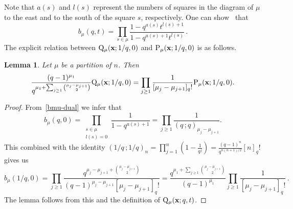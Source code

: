 \documentclass[12pt,a4paper,reqno]{amsart}
\theoremstyle{plain}
\newtheorem{lemma}[theorem]{Lemma}
\theoremstyle{definition}
\newcommand{\1}{\mathds{1}}
\renewcommand{\P}{\mathrm{P}}
\newcommand{\Q}{\mathrm{Q}}
\newcommand{\x}{{\bf x}}
\begin{document}
Note that $a(s)$ and $l(s)$ represent the numbers of squares in the diagram of $\mu$ to the east and to the south of the square $s$, respectively. One can show~\cite[p. 339, Eq. (6.19)]{Macdonald} that
\begin{equation}\label{bmu-dual}
b_\mu(q, t) = \prod_{s\in \mu}\frac{1-q^{a(s)}t^{l(s)+1}}{1-q^{a(s)+1}t^{l(s)}}\, .
\end{equation}
The explicit relation between $\Q_\mu(\x;1/q,0)$ and $\P_\mu(\x;1/q,0)$ is as follows.   
\begin{lemma}\label{b_mu(1/q)} Let $\mu$ be a partition of $n$. 
Then 
\begin{equation}
    \frac{(q-1)^{\mu_1}}{q^{\mu_1+\sum_{j\geq 1}\binom{\mu_j-\mu_{j+1}}{2}}}\Q_{\mu}(\x;1/q,0)=\prod_{j\geq 1}\frac{1}{[\mu_j-\mu_{j+1}]_q!}\P_{\mu}(\x;1/q,0).
\end{equation}
\end{lemma}
\begin{proof}
    From~\cref{bmu-dual} we infer that
\begin{equation}\label{bmu0-rel}
    b_{\mu}(q,0)=\prod_{\substack{s\in\mu\\ l(s)=0}}\frac{1}{1-q^{a(s)+1}}=\prod_{j\geq 1}\frac{1}{(q\, ;q)_{\mu_j-\mu_{j+1}}}.
\end{equation}
    This combined with
the identity     
$
(1/q\,;1/q)_n=\prod_{j=1}^n\left(1-\frac{1}{q^j}\right)=\frac{(q-1)^n}{q^{n(n+1)/2}}[n]_q!$ gives us
    $$
    b_{\mu}(1/q,0)=\prod_{j\geq 1}\frac{q^{\mu_j-\mu_{j+1}+\binom{\mu_j-\mu_{j+1}}{2}}}{(q-1)^{\mu_j-\mu_{j+1}}[\mu_j-\mu_{j+1}]_q!}=\frac{q^{\mu_1+\sum_{j\geq 1}\binom{\mu_j-\mu_{j+1}}{2}}}{(q-1)^{\mu_1}}\prod_{j\geq 1}\frac{1}{[\mu_j-\mu_{j+1}]_q!}\, . 
    $$
  The lemma follows from this and the definition of $\Q_\mu(\x;q,t)$. 
\end{proof}
\end{document}
